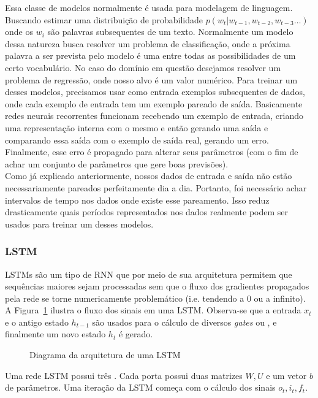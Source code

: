 Essa classe de modelos normalmente é usada para modelagem de linguagem. Buscando
estimar uma distribuição de probabilidade $p(w_t | w_{t-1},w_{t-2},w_{t-3} \dots
) $ onde os $w_i$ são palavras subsequentes de um texto. Normalmente um modelo
dessa natureza busca resolver um problema de classificação, onde a próxima palavra
a ser prevista pelo modelo é uma entre todas as possibilidades de um certo
vocabulário. No caso do domínio em questão desejamos resolver um problema de
regressão, onde nosso alvo é um valor numérico. Para treinar um desses modelos,
precisamos usar como entrada exemplos subsequentes de dados, onde cada exemplo
de entrada tem um exemplo pareado de saída. Basicamente redes neurais
recorrentes funcionam recebendo um exemplo de entrada, criando uma representação
interna com o mesmo e então gerando uma saída e comparando essa saída com o
exemplo de saída real, gerando um erro. Finalmente, esse erro é propagado para
alterar seus parâmetros (com o fim de achar um conjunto de parâmetros que gere
boas previsões). \\ 


Como já explicado anteriormente, nossos dados de entrada e saída não estão necessariamente pareados perfeitamente dia a dia. Portanto, foi necessário achar intervalos de tempo nos dados onde existe esse pareamento. Isso reduz drasticamente quais períodos representados nos dados realmente podem ser usados para treinar um desses modelos.


\subsubsection{LSTM}
\label{sec:lstm}

LSTMs \citep{lstm} são um tipo de RNN que por meio de sua arquitetura permitem que sequências
maiores sejam processadas sem que o fluxo dos gradientes propagados pela rede se torne
numericamente problemático (i.e. tendendo a 0 ou a infinito). A
Figura~\ref{fig:lstm} ilustra o fluxo dos sinais em uma LSTM. Observa-se que a
entrada $x_t$ e o antigo estado $h_{t-1}$ são usados para o cálculo de diversos \textit{gates} ou , e
finalmente um novo estado $h_t$ é gerado.\\

\begin{figure}
\centering
\caption{Diagrama da arquitetura de uma LSTM}

\label{fig:lstm}
\end{figure}




Uma rede LSTM possui três . Cada porta possui duas matrizes $W,U$ e um
vetor $b$ de parâmetros. Uma iteração da LSTM começa com o cálculo dos sinais
$o_t,i_t,f_t$.\\

